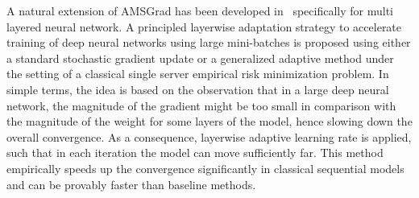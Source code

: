 \documentclass[11pt]{article}
\begin{document}


A natural extension of AMSGrad has been developed in~\citep{you2019large} specifically for multi layered neural network. 
A principled layerwise adaptation strategy to accelerate training of deep neural networks using large mini-batches is proposed using either a standard stochastic gradient update or a generalized adaptive method under the setting of a classical single server empirical risk minimization problem. 
 In simple terms, the idea is based on the observation that in a large deep neural network, the magnitude of the gradient might be too small in comparison with the magnitude of the weight for some layers of the model, hence slowing down the overall convergence. 
As a consequence, layerwise adaptive learning rate is applied, such that in each iteration the model can move sufficiently far. 
This method empirically speeds up the convergence significantly in classical sequential models and can be provably faster than baseline methods.


\vspace{0.05in}
\end{document}
